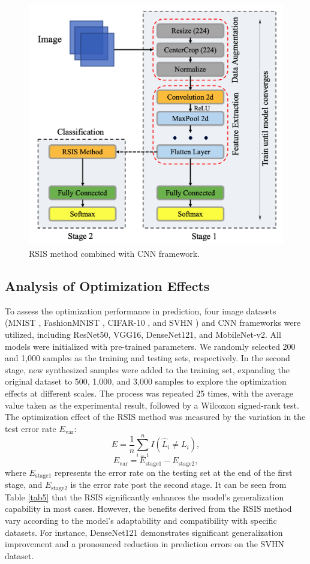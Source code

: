 \documentclass[final,3p,times]{elsarticle}
\begin{document}
\begin{figure}[h!]
  \centering
  \includegraphics[width=4.6in]{Fig7.png}
  \caption{RSIS method combined with CNN framework.}
  \label{Fig7}
\end{figure}


\subsection{Analysis of Optimization Effects}
To assess the optimization performance in prediction, four 
image datasets (MNIST \cite{bib88}, FashionMNIST \cite{bib89}, CIFAR-10 \cite{bib90}, and 
SVHN \cite{bib91}) and CNN frameworks were utilized, including ResNet50, 
VGG16, DenseNet121, and MobileNet-v2. All models were initialized 
with pre-trained parameters. We randomly selected 200 and 1,000 
samples as the training and testing sets, respectively. In the 
second stage, new synthesized samples were added to the training 
set, expanding the original dataset to 500, 1,000, and 3,000 
samples to explore the optimization effects at different scales. 
The process was repeated 25 times, with the average value taken 
as the experimental result, followed by a Wilcoxon signed-rank 
test. The optimization effect of the RSIS method was measured by 
the variation in the test error rate $E_{\text{var}}$:
\begin{equation}
\label{eq19}
  E=\dfrac{1}{n}\sum\limits_{i=1}^n{I}(\hat{L}_i\neq L_i),
\end{equation}
\begin{equation}
\label{eq20}
  E_{\text{var}}=E_{\text{stage1}}-E_{\text{stage2}},
\end{equation}
where $E_{\text{stage1}}$ represents the error rate on the testing 
set at the end of the first stage, and $E_{\text{stage2}}$ is 
the error rate post the second stage. It can be seen from Table \ref{tab5} 
that the RSIS significantly enhances the model's generalization 
capability in most cases. However, the benefits derived from the 
RSIS method vary according to the model's adaptability and 
compatibility with specific datasets. For instance, DenseNet121 
demonstrates significant generalization improvement and a 
pronounced reduction in prediction errors on the SVHN dataset.
\end{document}
